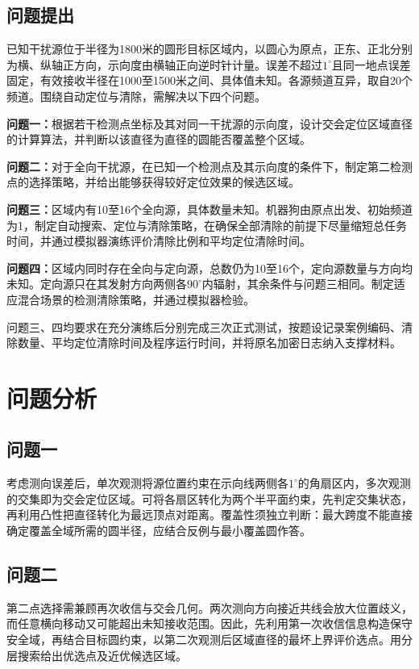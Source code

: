 \documentclass{JXUSTmodeling}
\begin{document}
\subsection{问题提出}\label{sub:1.2}
已知干扰源位于半径为1800米的圆形目标区域内，以圆心为原点，正东、正北分别为横、纵轴正方向，示向度由横轴正向逆时针计量。误差不超过$1^\circ$且同一地点误差固定，有效接收半径在1000至1500米之间、具体值未知。各源频道互异，取自20个频道。围绕自动定位与清除，需解决以下四个问题。

\textbf{问题一：}根据若干检测点坐标及其对同一干扰源的示向度，设计交会定位区域直径的计算算法，并判断以该直径为直径的圆能否覆盖整个区域。

\textbf{问题二：}对于全向干扰源，在已知一个检测点及其示向度的条件下，制定第二检测点的选择策略，并给出能够获得较好定位效果的候选区域。

\textbf{问题三：}区域内有10至16个全向源，具体数量未知。机器狗由原点出发、初始频道为1，制定自动搜索、定位与清除策略，在确保全部清除的前提下尽量缩短总任务时间，并通过模拟器演练评价清除比例和平均定位清除时间。

\textbf{问题四：}区域内同时存在全向与定向源，总数仍为10至16个，定向源数量与方向均未知。定向源只在其发射方向两侧各$90^\circ$内辐射，其余条件与问题三相同。制定适应混合场景的检测清除策略，并通过模拟器检验。

问题三、四均要求在充分演练后分别完成三次正式测试，按题设记录案例编码、清除数量、平均定位清除时间及程序运行时间，并将原名加密日志纳入支撑材料。

\section{问题分析}\label{sec:2}
\subsection{问题一}\label{sub:2.1}
考虑测向误差后，单次观测将源位置约束在示向线两侧各$1^\circ$的角扇区内，多次观测的交集即为交会定位区域。可将各扇区转化为两个半平面约束，先判定交集状态，再利用凸性把直径转化为最远顶点对距离。覆盖性须独立判断：最大跨度不能直接确定覆盖全域所需的圆半径，应结合反例与最小覆盖圆作答。

\subsection{问题二}\label{sub:2.2}
第二点选择需兼顾再次收信与交会几何。两次测向方向接近共线会放大位置歧义，而任意横向移动又可能超出未知接收范围。因此，先利用第一次收信信息构造保守安全域，再结合目标圆约束，以第二次观测后区域直径的最坏上界评价选点。用分层搜索给出优选点及近优候选区域。
\end{document}

